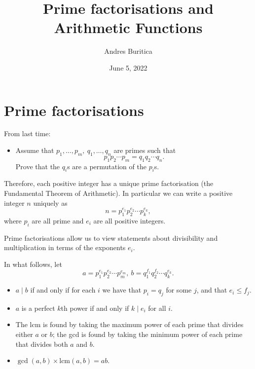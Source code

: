 \documentclass{article}
\title{Prime factorisations and Arithmetic Functions}
\author{Andres Buritica}
\date{June 5, 2022}
\newcommand\lcm{\text{lcm}}
\begin{document}
\maketitle
\section{Prime factorisations}
  From last time:
  \begin{itemize}
    \item Assume that $p_1,\ldots,p_m,\ q_1,\ldots,q_n$ are primes such that
      \[p_1p_2\cdots p_m=q_1q_2\cdots q_n.\]
      Prove that the $q_i$s are a permutation of the $p_i$s.
  \end{itemize}
  Therefore, each positive integer has a unique prime factorisation (the
  Fundamental Theorem of Arithmetic).
  In particular we can write a positive integer $n$ uniquely as
  \[n=p_1^{e_1}p_2^{e_2}\cdots p_k^{e_k},\]
  where $p_i$ are all prime and $e_i$ are all positive integers.

  Prime factorisations allow us to view statements about divisibility and
  multiplication in terms of the exponents $e_i$.

  In what follows, let 
  \[a=p_1^{e_1}p_2^{e_2}\cdots p_m^{e_m},\
        b=q_1^{f_1}q_2^{f_2}\cdots q_k^{e_k}.\]
  \begin{itemize}
    \item $a\mid b$ if and only if for each $i$ we have that $p_i=q_j$
      for some $j$, and that $e_i\le f_j$.
    \item $a$ is a perfect $k$th power if and only if $k\mid e_i$ for all $i$.
    \item The lcm is found by taking the maximum power of each prime that
      divides either $a$ or $b$; the gcd is found by taking the minimum power of
      each prime that divides both $a$ and $b$.
    \item $\gcd(a,b)\times\lcm(a,b)=ab$.
  \end{itemize}
  \newpage
\end{document}
